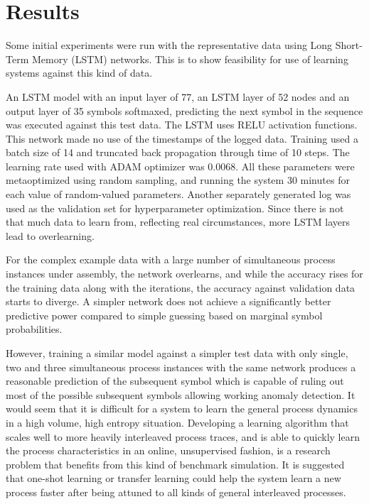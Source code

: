 \documentclass[journal]{IEEEtran}
\begin{document}
\section{Results}

Some initial experiments were run with the representative data using Long Short-Term Memory (LSTM) networks. This is to show feasibility for use of learning systems
against this kind of data.

An LSTM model with an input layer of 77, an LSTM layer of 52 nodes and an output layer of 35 symbols softmaxed,
predicting the next symbol in the sequence was executed against this test data. The LSTM uses RELU activation functions. This network made no use of the timestamps
of the logged data.
Training used a batch size of 14 and truncated back propagation through time of 10 steps. The learning rate used with ADAM optimizer was 0.0068. All these parameters
were metaoptimized using random sampling, and running the system 30 minutes for each value of random-valued parameters. Another separately generated log was used
as the validation set for hyperparameter optimization. Since there is not that much data to learn from, reflecting real circumstances, more LSTM layers lead to overlearning.

For the complex example data with a large number of simultaneous process instances under assembly, the network overlearns, and while the accuracy rises for the training data along with the iterations,
the accuracy against validation data starts to diverge. A simpler network does not achieve a significantly better predictive power compared to simple guessing based on marginal symbol probabilities.

However, training a similar model against a simpler test data with only single, two and three simultaneous process instances with the same network produces a reasonable
prediction of the subsequent symbol which is capable of ruling out most of the possible subsequent symbols allowing working anomaly detection.
It would seem that it is difficult for a system to learn the general process dynamics in a high volume, high entropy situation.
Developing a learning algorithm that scales well to more heavily interleaved process traces, and is able to quickly learn the process characteristics in an online,
unsupervised fashion, is a research problem that benefits from this kind of benchmark simulation. It is suggested that one-shot learning or transfer learning could help the system learn a new process
faster after being attuned to all kinds of general interleaved processes.
\end{document}
